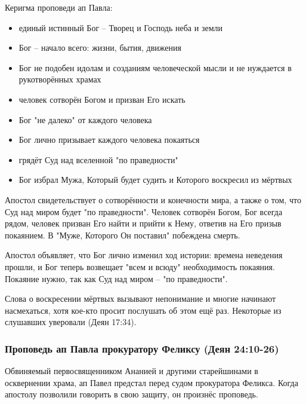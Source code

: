 Керигма проповеди ап Павла:
\begin{itemize}
	\item единый истинный Бог – Творец и Господь неба и земли
	\item Бог – начало всего: жизни, бытия, движения
	\item Бог не подобен идолам и созданиям человеческой мысли и не нуждается в рукотворённых храмах
	\item человек сотворён Богом и призван Его искать
	\item Бог "не далеко" от каждого человека
	\item Бог лично призывает каждого человека покаяться
	\item грядёт Суд над вселенной "по праведности"
	\item Бог избрал Мужа, Который будет судить и Которого воскресил из мёртвых
\end{itemize}

Апостол свидетельствует о сотворённости и конечности мира, а также о том, что Суд над миром будет "по праведности".
Человек сотворён Богом, Бог всегда рядом, человек призван Его найти и прийти к Нему, ответив на Его призыв покаянием.
В "Муже, Которого Он поставил" побеждена смерть.

Апостол объявляет, что Бог лично изменил ход истории: времена неведения прошли, и Бог теперь возвещает "всем и всюду" необходимость покаяния.
Покаяние нужно, так как Суд над миром – "по праведности".

Слова о воскресении мёртвых вызывают непонимание и многие начинают насмехаться, хотя кое-кто просит послушать об этом ещё раз.
Некоторые из слушавших уверовали (Деян 17:34).

\subsubsection*{Проповедь ап Павла прокуратору Феликсу (Деян 24:10-26)}
Обвиняемый первосвященником Ананией и другими старейшинами в осквернении храма, ап Павел предстал перед судом прокуратора Феликса.
Когда апостолу позволили говорить в свою защиту, он произнёс проповедь.


